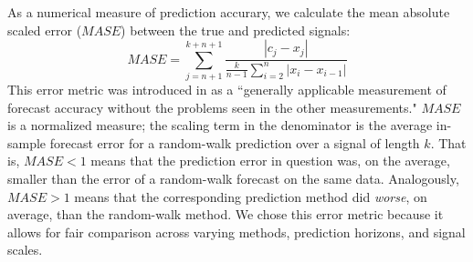 As a numerical measure of prediction accurary, we calculate the mean
absolute scaled error ($MASE$) between the true and predicted signals:
% 
$$MASE = \sum_{j=n+1}^{k+n+1}\frac{|c_j-x_j|
}{\frac{k}{n-1}\sum^n_{i=2}|x_{i}-x_{i-1}|}$$
% 
This error metric was introduced in \cite{MASE} as a ``generally
applicable measurement of forecast accuracy without the problems seen
in the other measurements."  $MASE$ is a normalized measure; the
scaling term in the denominator
% 
% 
is the average in-sample forecast error for a random-walk prediction
over a signal of length $k$.  That is, $MASE<1$ means that the
prediction error in question was, on the average, smaller than the
error of a random-walk forecast on the same data.  Analogously,
$MASE>1$ means that the corresponding prediction method did
\emph{worse}, on average, than the random-walk method.  We chose this
error metric because it allows for fair comparison across varying
methods, prediction horizons, and signal scales.

